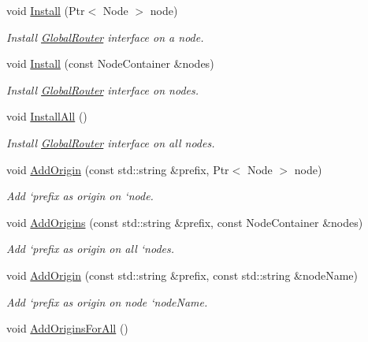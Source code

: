 \begin{DoxyCompactItemize}
\item 
void \hyperlink{classns3_1_1ndn_1_1GlobalRoutingHelper_a68947c9762ed7795368fcca7b35bf6c5}{Install} (Ptr$<$ Node $>$ node)
\begin{DoxyCompactList}\small\item\em Install \hyperlink{classns3_1_1ndn_1_1GlobalRouter}{Global\+Router} interface on a node. \end{DoxyCompactList}\item 
void \hyperlink{classns3_1_1ndn_1_1GlobalRoutingHelper_a4ca724f151dc7dcc9a6176b58825de10}{Install} (const Node\+Container \&nodes)
\begin{DoxyCompactList}\small\item\em Install \hyperlink{classns3_1_1ndn_1_1GlobalRouter}{Global\+Router} interface on nodes. \end{DoxyCompactList}\item 
void \hyperlink{classns3_1_1ndn_1_1GlobalRoutingHelper_ae7f137af43179eddc6c1abc02ad8a3d5}{Install\+All} ()\hypertarget{classns3_1_1ndn_1_1GlobalRoutingHelper_ae7f137af43179eddc6c1abc02ad8a3d5}{}\label{classns3_1_1ndn_1_1GlobalRoutingHelper_ae7f137af43179eddc6c1abc02ad8a3d5}

\begin{DoxyCompactList}\small\item\em Install \hyperlink{classns3_1_1ndn_1_1GlobalRouter}{Global\+Router} interface on all nodes. \end{DoxyCompactList}\item 
void \hyperlink{classns3_1_1ndn_1_1GlobalRoutingHelper_a812967d38e09d1fcf673248581ecef9c}{Add\+Origin} (const std\+::string \&prefix, Ptr$<$ Node $>$ node)
\begin{DoxyCompactList}\small\item\em Add `prefix\textquotesingle{} as origin on `node\textquotesingle{}. \end{DoxyCompactList}\item 
void \hyperlink{classns3_1_1ndn_1_1GlobalRoutingHelper_ae5090ca7825ecc9b266f3e17710b5ffd}{Add\+Origins} (const std\+::string \&prefix, const Node\+Container \&nodes)
\begin{DoxyCompactList}\small\item\em Add `prefix\textquotesingle{} as origin on all `nodes\textquotesingle{}. \end{DoxyCompactList}\item 
void \hyperlink{classns3_1_1ndn_1_1GlobalRoutingHelper_a452ca5ef0c3cdcaae29abc743708c17e}{Add\+Origin} (const std\+::string \&prefix, const std\+::string \&node\+Name)
\begin{DoxyCompactList}\small\item\em Add `prefix\textquotesingle{} as origin on node `node\+Name\textquotesingle{}. \end{DoxyCompactList}\item 
void \hyperlink{classns3_1_1ndn_1_1GlobalRoutingHelper_a7fa8e98bb8605fcb65238f4ae16c212b}{Add\+Origins\+For\+All} ()\hypertarget{classns3_1_1ndn_1_1GlobalRoutingHelper_a7fa8e98bb8605fcb65238f4ae16c212b}{}\label{classns3_1_1ndn_1_1GlobalRoutingHelper_a7fa8e98bb8605fcb65238f4ae16c212b}


\end{DoxyCompactItemize}
